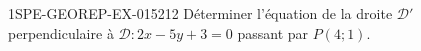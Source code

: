 \begin{exercice}{1SPE-GEOREP-EX-015}{2}{12}
Déterminer l'équation de la droite $\mathcal{D}'$ perpendiculaire à $\mathcal{D} : 2x - 5y + 3 = 0$ passant par $P(4 ; 1)$.
\end{exercice}
